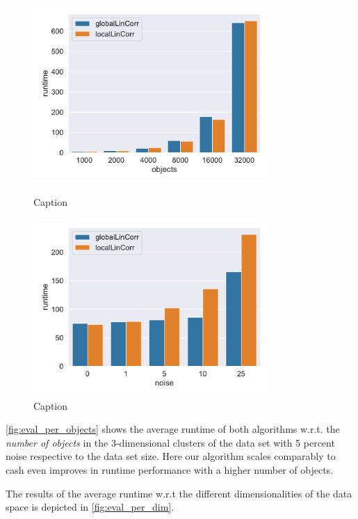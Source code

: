 \begin{figure}
    \centering
    \includegraphics[width=0.8\textwidth]{evaluation/Avg_Runtime_3D_N5_pobjects_bar.pdf}
    \caption{Caption}
    \label{fig:eval_per_objects}    \includegraphics[width=0.8\textwidth]{evaluation/Avg_Runtime_3D_O10000_pnoise_bar.pdf}
    \caption{Caption}
    \label{fig:eval_per_noise}
\end{figure}

\autoref{fig:eval_per_objects} shows the average runtime of both algorithms w.r.t. the \textit{number of objects} in the 3-dimensional clusters of the data set with 5 percent noise respective to the data set size. Here our algorithm scales comparably to \gls{cash} even improves in runtime performance with a higher number of objects. 


The results of the average runtime w.r.t the different dimensionalities of the data space is depicted in \autoref{fig:eval_per_dim}.

